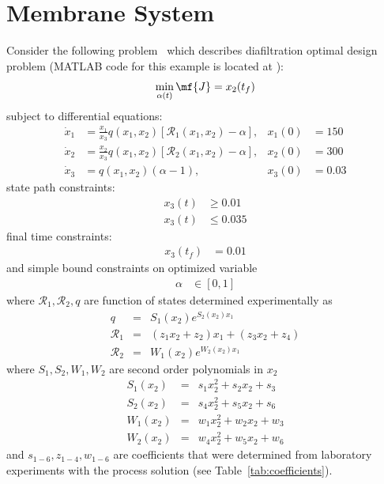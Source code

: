 \section{Membrane System}
\label{sec:probmem}

Consider the following problem~\citep{fik10jms} which describes
diafiltration optimal design problem (MATLAB code for this example is located at
):
\begin{equation}
  \min_{\alpha(t)} \mf{J} = x_2(t_f)
\end{equation}
subject to differential equations:
\begin{align}
  \dot{x}_1 & = \frac{x_1}{ x_3}
q(x_1, x_2)\left[\mathcal{R}_1(x_1, x_2)-\alpha \right], &
 x_1(0) &= 150  \\
\dot{x}_2 & = \frac{x_2}{ x_3}
q(x_1, x_2)\left[\mathcal{R}_2(x_1, x_2)-\alpha\right], &
 x_2(0) &= 300 \\
\dot{x}_3 &= q(x_1, x_2)(\alpha - 1), &
x_3(0) &= 0.03 
\end{align}
state path constraints:
\begin{align}
  x_3(t) &\ge 0.01 \\
  x_3(t) &\le 0.035
\end{align}
final time constraints:
\begin{align}
  x_3(t_f) &= 0.01 
\end{align}
and simple bound constraints on optimized variable
\begin{align}
  \alpha &\in [0, 1] 
\end{align}
where $\mathcal{R}_1, \mathcal{R}_2, q$ are function of states
determined experimentally as 
\begin{eqnarray} 
q &=& S_1(x_2) e^{S_2(x_2) x_1} \label{eq:Jempiric} \\
\mathcal{R}_1 &=& (z_1 x_2+z_2) x_1  +  ( z_3 x_2+z_4) \label{eq:R1empiric} \\
\mathcal{R}_2 &=& W_1(x_2) e^{W_2(x_2) x_1}	\label{eq:R2empiric}
\end{eqnarray}
where $S_1, S_2, W_1, W_2$ are second order polynomials in $x_2$
\begin{eqnarray} 
S_1(x_2) &=& s_1 x_2^2 + s_2 x_2+s_3 \\
S_2(x_2) &=& s_4 x_2^2 + s_5 x_2+s_6 \\
W_1(x_2) &=& w_1 x_2^2 + w_2 x_2+w_3 \\
W_2(x_2) &=& w_4 x_2^2 + w_5 x_2+w_6 \label{eq:W}
\end{eqnarray}
and $s_{1-6}, z_{1-4},w_{1-6}$ are coefficients that were determined
from laboratory experiments with the process solution
(see Table~\ref{tab:coefficients}).

